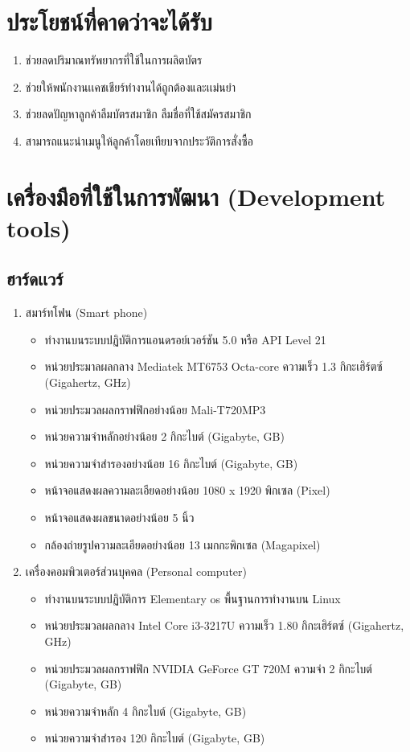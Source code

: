 \section{ประโยชน์ที่คาดว่าจะได้รับ}
\begin{enumerate}
	\item ช่วยลดปริมาณทรัพยากรที่ใช้ในการผลิตบัตร 
	\item ช่วยให้พนักงานเเคชเชียร์ทำงานได้ถูกต้องและเเม่นยำ 
   \item ช่วยลดปัญหาลูกค้าลืมบัตรสมาชิก ลืมชื่อที่ใช้สมัครสมาชิก
   \item สามารถแนะนำเมนูให้ลูกค้าโดยเทียบจากประวัติการสั่งซื้อ 
\end{enumerate}
\section{เครื่องมือที่ใช้ในการพัฒนา (Development tools)}
\subsection{ฮาร์ดเเวร์}
\begin{enumerate}
	\item สมาร์ทโฟน (Smart phone)
		\begin{itemize}
			\item ทำงานบนระบบปฏิบัติการแอนดรอย์เวอร์ชัน 5.0 หรือ API Level 21
			\item หน่วยประมาลผลกลาง Mediatek MT6753 Octa-core ความเร็ว 1.3 กิกะเฮิร์ตซ์ (Gigahertz, GHz)
			\item หน่วยประมวลผลกราฟฟิกอย่างน้อย Mali-T720MP3
			\item หน่วยความจำหลักอย่างน้อย 2 กิกะไบต์ (Gigabyte, GB)
			\item หน่วยความจำสำรองอย่างน้อย 16 กิกะไบต์ (Gigabyte, GB)
			\item หน้าจอแสดงผลความละเอียดอย่างน้อย 1080 x 1920 พิกเซล  (Pixel)
			\item หน้าจอแสดงผลขนาดอย่างน้อย 5 นิ้ว
			\item กล้องถ่ายรูปความละเอียดอย่างน้อย 13 เมกกะพิกเซล (Magapixel)
		\end{itemize}
	
	\item เครื่องคอมพิวเตอร์ส่วนบุคคล (Personal computer)
		\begin{itemize}
			\item  ทำงานบนระบบปฏิบัติการ Elementary os พื้นฐานการทำงานบน Linux
			\item  หน่วยประมวลผลกลาง Intel Core i3-3217U ความเร็ว 1.80 กิกะเฮิร์ตซ์ (Gigahertz, GHz)
			\item  หน่วยประมวลผลกราฟฟิก NVIDIA GeForce GT 720M ความจำ 2 กิกะไบต์ (Gigabyte, GB) 
			\item  หน่วยความจำหลัก 4 กิกะไบต์ (Gigabyte, GB)
			\item  หน่วยความจำสำรอง 120 กิกะไบต์ (Gigabyte, GB)
		\end{itemize}
\end{enumerate}

